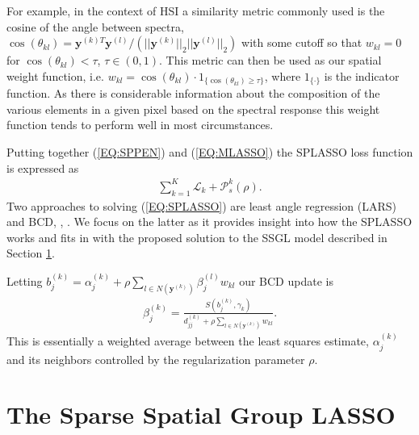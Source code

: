 \documentclass{article}
\numberwithin{equation}{section}
\theoremstyle{plain}
\newcommand{\bs}{\boldsymbol}
\begin{document}
For example, in the
context of HSI a similarity metric commonly used is the cosine of the angle
between spectra, $\cos(\theta_{kl}) = \mathbf{y}^{(k)T} \mathbf{y}^{(l)} /
(||\mathbf{y}^{(k)}||_2 ||\mathbf{y}^{(l)}||_2)$ with some cutoff so that
$w_{kl} = 0$ for $\cos(\theta_{kl}) < \tau$, $\tau \in (0, 1)$. This metric can
then be used as our spatial weight function, i.e. $w_{kl} = \cos(\theta_{kl}) \cdot
1_{\{ \cos(\theta_{kl}) \geq \tau \}}$, where $1_{\{ \cdot \}}$ is the
indicator function.
As there is considerable information about the composition of the various
elements in a given pixel based on the spectral response this weight function
tends to perform well in most circumstances. 


Putting together (\ref{EQ:SPPEN}) and (\ref{EQ:MLASSO}) the SPLASSO loss
function is expressed as
\begin{align}
\label{EQ:SPLASSO}
\sum_{k=1}^K \mathcal{L}_k
+ \mathcal{P}_s^{k}(\rho).
\end{align}
\noindent Two approaches to solving (\ref{EQ:SPLASSO}) are
least angle regression (LARS) and 
BCD, \cite{lars2004} , \cite{samarov2014splasso}. We
focus on the latter as it provides insight into how the SPLASSO works
and fits in with the proposed solution to the SSGL model described in Section
\ref{SEC:SSGL}. 

Letting $b_j^{(k)} = \alpha_j^{(k)} + \rho \sum_{l \in N(\mathbf{y}^{(k)})}
\beta_j^{(l)}w_{kl}$ our BCD update is
\begin{align*}
\beta_j^{(k)} = 
\frac{S(b_j^{(k)}, \gamma_k)}{d^{(k)}_{jj} + \rho \sum_{l \in
N(\mathbf{y}^{(k)})} w_{kl}}.
\end{align*}
\noindent This is essentially a weighted average between the least squares
estimate, $\alpha_j^{(k)}$ and its neighbors controlled by the regularization
parameter $\rho$. 


\section{The Sparse Spatial Group LASSO}
\label{SEC:SSGL}
\end{document}
